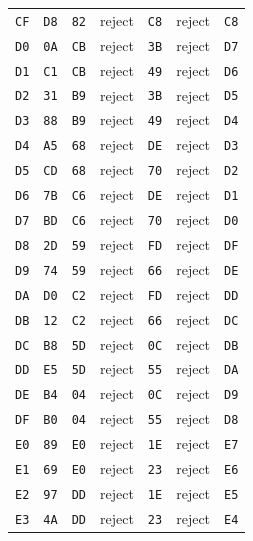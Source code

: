 \begin{longtable}{lllllll}
\texttt{CF} & \texttt{D8} & \texttt{82} & reject & \texttt{C8} & reject & \texttt{C8}\\
\texttt{D0} & \texttt{0A} & \texttt{CB} & reject & \texttt{3B} & reject & \texttt{D7}\\
\texttt{D1} & \texttt{C1} & \texttt{CB} & reject & \texttt{49} & reject & \texttt{D6}\\
\texttt{D2} & \texttt{31} & \texttt{B9} & reject & \texttt{3B} & reject & \texttt{D5}\\
\texttt{D3} & \texttt{88} & \texttt{B9} & reject & \texttt{49} & reject & \texttt{D4}\\
\texttt{D4} & \texttt{A5} & \texttt{68} & reject & \texttt{DE} & reject & \texttt{D3}\\
\texttt{D5} & \texttt{CD} & \texttt{68} & reject & \texttt{70} & reject & \texttt{D2}\\
\texttt{D6} & \texttt{7B} & \texttt{C6} & reject & \texttt{DE} & reject & \texttt{D1}\\
\texttt{D7} & \texttt{BD} & \texttt{C6} & reject & \texttt{70} & reject & \texttt{D0}\\
\texttt{D8} & \texttt{2D} & \texttt{59} & reject & \texttt{FD} & reject & \texttt{DF}\\
\texttt{D9} & \texttt{74} & \texttt{59} & reject & \texttt{66} & reject & \texttt{DE}\\
\texttt{DA} & \texttt{D0} & \texttt{C2} & reject & \texttt{FD} & reject & \texttt{DD}\\
\texttt{DB} & \texttt{12} & \texttt{C2} & reject & \texttt{66} & reject & \texttt{DC}\\
\texttt{DC} & \texttt{B8} & \texttt{5D} & reject & \texttt{0C} & reject & \texttt{DB}\\
\texttt{DD} & \texttt{E5} & \texttt{5D} & reject & \texttt{55} & reject & \texttt{DA}\\
\texttt{DE} & \texttt{B4} & \texttt{04} & reject & \texttt{0C} & reject & \texttt{D9}\\
\texttt{DF} & \texttt{B0} & \texttt{04} & reject & \texttt{55} & reject & \texttt{D8}\\
\texttt{E0} & \texttt{89} & \texttt{E0} & reject & \texttt{1E} & reject & \texttt{E7}\\
\texttt{E1} & \texttt{69} & \texttt{E0} & reject & \texttt{23} & reject & \texttt{E6}\\
\texttt{E2} & \texttt{97} & \texttt{DD} & reject & \texttt{1E} & reject & \texttt{E5}\\
\texttt{E3} & \texttt{4A} & \texttt{DD} & reject & \texttt{23} & reject & \texttt{E4}\\

\end{longtable}
